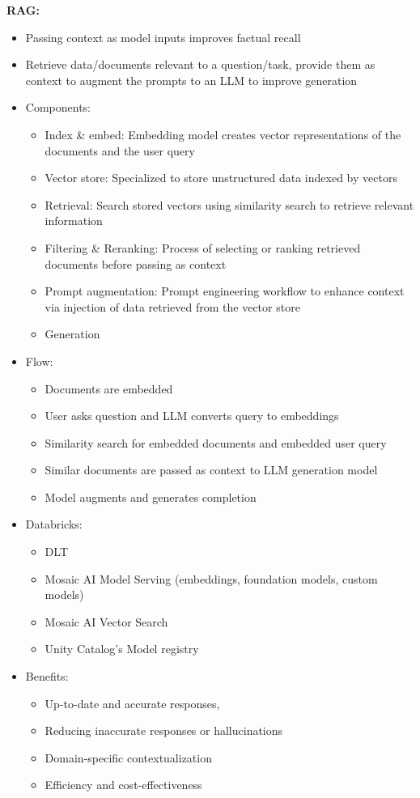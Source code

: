 \documentclass[11pt]{scrartcl}
\begin{document}
\textbf{RAG:}
\begin{itemize}
	\item Passing context as model inputs improves factual recall
	\item Retrieve data/documents relevant to a question/task, provide them as context to augment the prompts to an LLM to improve generation
	\item Components:
	\begin{itemize}
		\item Index \& embed: Embedding model creates vector representations of the documents and the user query
		\item Vector store: Specialized to store unstructured data indexed by vectors
		\item Retrieval: Search stored vectors using similarity search to retrieve relevant information
		\item Filtering \& Reranking: Process of selecting or ranking retrieved documents before passing as context
		\item Prompt augmentation: Prompt engineering workflow to enhance context via injection of data retrieved from the vector store
		\item Generation
	\end{itemize}
	\item Flow: 
	\begin{itemize}
		\item Documents are embedded
		\item User asks question and LLM converts query to embeddings
		\item Similarity search for embedded documents and embedded user query
		\item Similar documents are passed as context to LLM generation model
		\item Model augments and generates completion
	\end{itemize}
	\item Databricks:
	\begin{itemize}
		\item DLT
		\item Mosaic AI Model Serving (embeddings, foundation models, custom models)
		\item Mosaic AI Vector Search
		\item Unity Catalog's Model registry
	\end{itemize}
	\item Benefits: 
	\begin{itemize}
		\item Up-to-date and accurate responses,
		\item Reducing inaccurate responses or hallucinations
		\item Domain-specific contextualization
		\item Efficiency and cost-effectiveness
	\end{itemize}
\end{itemize}
\end{document}
